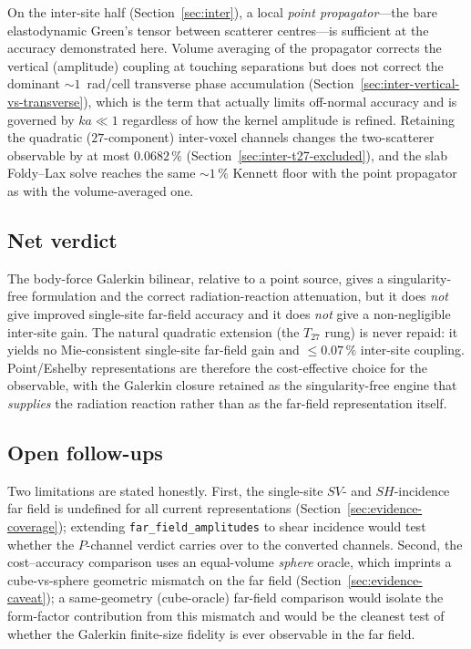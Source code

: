 \documentclass[11pt,a4paper]{article}
\theoremstyle{plain}
\theoremstyle{definition}
\theoremstyle{remark}
\begin{document}
On the inter-site half (Section~\ref{sec:inter}), a local \emph{point
propagator}---the bare elastodynamic Green's tensor between scatterer
centres---is sufficient at the accuracy demonstrated here.  Volume averaging
of the propagator corrects the vertical (amplitude) coupling at touching
separations but does not correct the dominant ${\sim}1$~rad/cell transverse
phase accumulation (Section~\ref{sec:inter-vertical-vs-transverse}), which is
the term that actually limits off-normal accuracy and is governed by
$ka \ll 1$ regardless of how the kernel amplitude is refined.  Retaining the
quadratic ($27$-component) inter-voxel channels changes the two-scatterer
observable by at most $0.0682\,\%$ (Section~\ref{sec:inter-t27-excluded}),
and the slab Foldy--Lax solve reaches the same ${\sim}1\,\%$ Kennett floor with
the point propagator as with the volume-averaged one.

\subsection{Net verdict}
\label{sec:conclusion-verdict}

The body-force Galerkin bilinear, relative to a point source, gives a
singularity-free formulation and the correct radiation-reaction attenuation,
but it does \emph{not} give improved single-site far-field accuracy and it does
\emph{not} give a non-negligible inter-site gain.  The natural quadratic
extension (the $T_{27}$ rung) is never repaid: it yields no Mie-consistent
single-site far-field gain and $\le 0.07\,\%$ inter-site coupling.
Point/Eshelby representations are therefore the cost-effective choice for the
observable, with the Galerkin closure retained as the singularity-free engine
that \emph{supplies} the radiation reaction rather than as the far-field
representation itself.

\subsection{Open follow-ups}
\label{sec:conclusion-followups}

Two limitations are stated honestly.  First, the single-site $SV$- and
$SH$-incidence far field is undefined for all current representations
(Section~\ref{sec:evidence-coverage}); extending \texttt{far\_field\_amplitudes}
to shear incidence would test whether the $P$-channel verdict carries over to
the converted channels.  Second, the cost--accuracy comparison uses an
equal-volume \emph{sphere} oracle, which imprints a cube-vs-sphere geometric
mismatch on the far field (Section~\ref{sec:evidence-caveat}); a same-geometry
(cube-oracle) far-field comparison would isolate the form-factor contribution
from this mismatch and would be the cleanest test of whether the Galerkin
finite-size fidelity is ever observable in the far field.
\end{document}
